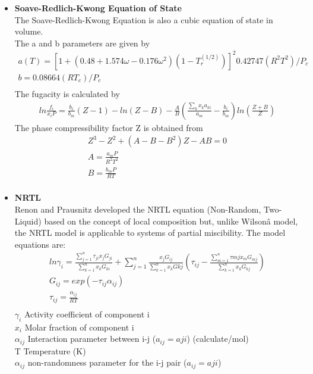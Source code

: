 \documentclass[12pt]{report}
\begin{document}
\begin{itemize}
\item {\textbf{Soave-Redlich-Kwong Equation of State}} \\
The Soave-Redlich-Kwong Equation \cite{SRK} is also a cubic equation of state in volume. \\
The a and b parameters are given by
\begin{gather*}
a(T) = [1 + (0.48 + 1.574\omega - 0.176\omega^2)(1-T_r^{(1/2)})]^{2}0.42747(R^2T^2)/P_c \\
b = 0.08664(RT_c)/P_c \\
\end{gather*}
The fugacity is calculated by
\begin{gather*}
ln\frac{f_i}{x_iP} = \frac{b_i}{b_m}(Z-1) - ln(Z-B) - \frac{A}{B}(\frac{\sum_kx_ka_{ki}}{a_m} - \frac{b_i}{b_m})ln(\frac{Z+B}{Z})
\end{gather*}
The phase compressibility factor Z is obtained from 
\begin{gather*}
Z^3 - Z^2 + (A - B - B^2)Z - AB = 0 \\
A = \frac{a_mP}{R^2T^2} \\
B = \frac{b_mP}{RT} \\
\end{gather*}

\item{\textbf{NRTL}}\\
Renon and Prausnitz \cite{NRTL} developed the NRTL equation (Non-Random, Two-Liquid) based on the concept of local composition but, unlike Wilsonâ  model, the NRTL model is applicable to systems of partial miscibility. The model equations are:
\begin{gather*}
ln\gamma_i = \frac{\sum_{j=1}^{n}\tau_{ji}x_jG_{ji}}{\sum_{k=1}^{n}x_kG_{ki}} + \sum_{j=1}^{n}\frac{x_jG_{ij}}{\sum_{k=1}^{n}x_kG{kj}}(\tau_{ij} - \frac{\sum_{m=1}^{n}\tau{mj}x_mG_{mj}}{\sum_{k=1}^{n}x_kG_{kj}}) \\
G_{ij} = exp(-\tau_{ij}\alpha_{ij}) \\
\tau_{ij} = \frac{\alpha_{ij}}{RT} \\
\end{gather*}
$\gamma_i$ Activity coefficient of component i \\
$x_i$ Molar fraction of component i \\
$\alpha_{ij}$ Interaction parameter between i-j ($a_{ij} = a{ji}$) (calculate/mol) \\
T Temperature (K) \\
$\alpha_{ij}$ non-randomness parameter for the i-j pair ($a_{ij} = a{ji}$)

\end{itemize}
\end{document}
